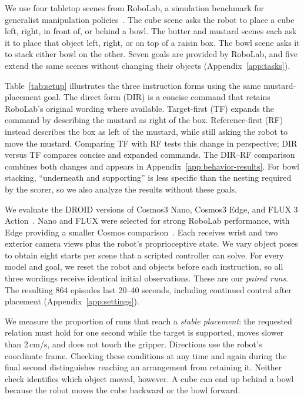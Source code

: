 \documentclass{article}
\begin{document}
\begin{samepage}
We use four tabletop scenes from RoboLab, a simulation benchmark for generalist manipulation policies~\citep{yang2026robolab}. The cube scene asks the robot to place a cube left, right, in front of, or behind a bowl. The butter and mustard scenes each ask it to place that object left, right, or on top of a raisin box. The bowl scene asks it to stack either bowl on the other. Seven goals are provided by RoboLab, and five extend the same scenes without changing their objects (Appendix~\ref{app:tasks}).
\par
\end{samepage}

Table~\ref{tab:setup} illustrates the three instruction forms using the same mustard-placement goal. The direct form (DIR) is a concise command that retains RoboLab's original wording where available. Target-first (TF) expands the command by describing the mustard as right of the box. Reference-first (RF) instead describes the box as left of the mustard, while still asking the robot to move the mustard. Comparing TF with RF tests this change in perspective; DIR versus TF compares concise and expanded commands. The DIR--RF comparison combines both changes and appears in Appendix~\ref{app:behavior-results}. For bowl stacking, ``underneath and supporting'' is less specific than the nesting required by the scorer, so we also analyze the results without these goals.

We evaluate the DROID versions of Cosmos3 Nano, Cosmos3 Edge, and FLUX 3 Action~\citep{nvidia2026nano,nvidia2026edge,bfl2026fluxaction}. Nano and FLUX were selected for strong RoboLab performance, with Edge providing a smaller Cosmos comparison~\citep{robolab2026leaderboard}. Each receives wrist and two exterior camera views plus the robot's proprioceptive state. We vary object poses to obtain eight starts per scene that a scripted controller can solve. For every model and goal, we reset the robot and objects before each instruction, so all three wordings receive identical initial observations. These are our \emph{paired runs}. The resulting 864 episodes last 20--40 seconds, including continued control after placement (Appendix~\ref{app:settings}).

We measure the proportion of runs that reach a \emph{stable placement}: the requested relation must hold for one second while the target is supported, moves slower than 2\,cm/s, and does not touch the gripper. Directions use the robot's coordinate frame. Checking these conditions at any time and again during the final second distinguishes reaching an arrangement from retaining it. Neither check identifies which object moved, however. A cube can end up behind a bowl because the robot moves the cube backward or the bowl forward.
\end{document}
